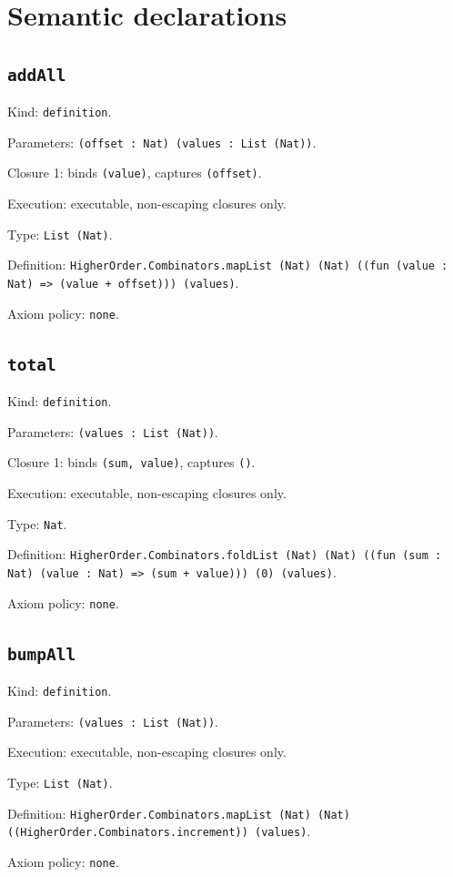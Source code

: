 \documentclass[11pt]{article}
\begin{document}
\section*{Semantic declarations}
\subsection*{\texttt{addAll}}
\noindent Kind: \texttt{definition}.\par
\noindent Parameters: \texttt{(offset : Nat) (values : List (Nat))}.\par
\noindent Closure 1: binds \texttt{(value)}, captures \texttt{(offset)}.\par
\noindent Execution: executable, non-escaping closures only.\par
\noindent Type: \texttt{List (Nat)}.\par
\noindent Definition: \texttt{HigherOrder.Combinators.mapList (Nat) (Nat) ((fun (value : Nat) => (value + offset))) (values)}.\par
\noindent Axiom policy: \texttt{none}.\par
\subsection*{\texttt{total}}
\noindent Kind: \texttt{definition}.\par
\noindent Parameters: \texttt{(values : List (Nat))}.\par
\noindent Closure 1: binds \texttt{(sum, value)}, captures \texttt{()}.\par
\noindent Execution: executable, non-escaping closures only.\par
\noindent Type: \texttt{Nat}.\par
\noindent Definition: \texttt{HigherOrder.Combinators.foldList (Nat) (Nat) ((fun (sum : Nat) (value : Nat) => (sum + value))) (0) (values)}.\par
\noindent Axiom policy: \texttt{none}.\par
\subsection*{\texttt{bumpAll}}
\noindent Kind: \texttt{definition}.\par
\noindent Parameters: \texttt{(values : List (Nat))}.\par
\noindent Execution: executable, non-escaping closures only.\par
\noindent Type: \texttt{List (Nat)}.\par
\noindent Definition: \texttt{HigherOrder.Combinators.mapList (Nat) (Nat) ((HigherOrder.Combinators.increment)) (values)}.\par
\noindent Axiom policy: \texttt{none}.\par
\end{document}
